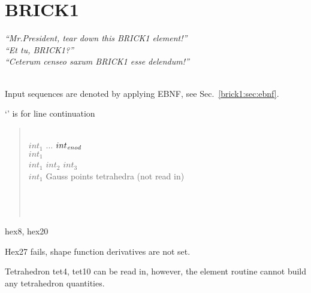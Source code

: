 



\chapter{BRICK1}
\begin{flushright}
\emph{``Mr.\@ President, tear down this BRICK1 element!''}\\
\emph{``Et tu, BRICK1?''}\\
\emph{``Ceterum censeo saxum BRICK1 esse delendum!''}
\end{flushright}

\\

Input sequences are denoted by applying EBNF, see Sec.~\ref{brick1:sec:ebnf}.

 `\cnl' is for line continuation
\begin{quote}
 \cnl \\
\cgb {} \cor {} \cge $int_1$ $\ldots$ $int_{\mathit{enod}}$ \cnl \\
 $int_1$ \cnl \\
 $int_1$ $int_2$ $int_3$ \cnl \\
 $int_1$ \cnl \chs Gauss points tetrahedra (not read in) \\
 \cgb {} \cor {} \cor {} \cor {} \cge \cnl \\
 \cgb {} \cor {} \cor {} \cge \cnl \\
 \cgb {} \cor {} \cor {} \cor {} \cor
{} \cor {} \cor {} \cor {} \cge \cnl \\
\ccb {} \cgb {} \cor {} \cor
{} \cge \cce
\end{quote}

 hex8, hex20

Hex27 fails, shape function derivatives are not set.

Tetrahedron tet4, tet10 can be read in, however, the element routine cannot
build any tetrahedron quantities.

